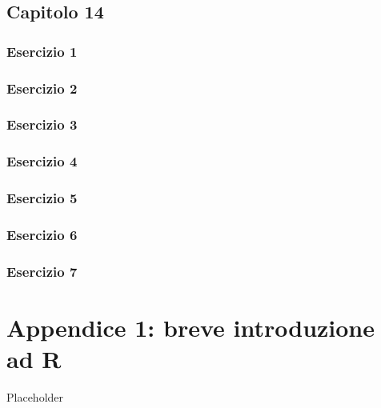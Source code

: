 \documentclass[a4paper,12pt,oneside]{book}
\begin{document}
\hypertarget{capitolo-14}{%
\section{Capitolo 14}\label{capitolo-14}}

\hypertarget{esercizio-1-9}{%
\subsection{Esercizio 1}\label{esercizio-1-9}}

\hypertarget{esercizio-2-9}{%
\subsection{Esercizio 2}\label{esercizio-2-9}}

\hypertarget{esercizio-3-7}{%
\subsection{Esercizio 3}\label{esercizio-3-7}}

\hypertarget{esercizio-4-5}{%
\subsection{Esercizio 4}\label{esercizio-4-5}}

\hypertarget{esercizio-5-4}{%
\subsection{Esercizio 5}\label{esercizio-5-4}}

\hypertarget{esercizio-6-3}{%
\subsection{Esercizio 6}\label{esercizio-6-3}}

\hypertarget{esercizio-7-2}{%
\subsection{Esercizio 7}\label{esercizio-7-2}}

\hypertarget{appendice-1-breve-introduzione-ad-r}{%
\chapter{Appendice 1: breve introduzione ad R}\label{appendice-1-breve-introduzione-ad-r}}

Placeholder
\end{document}
